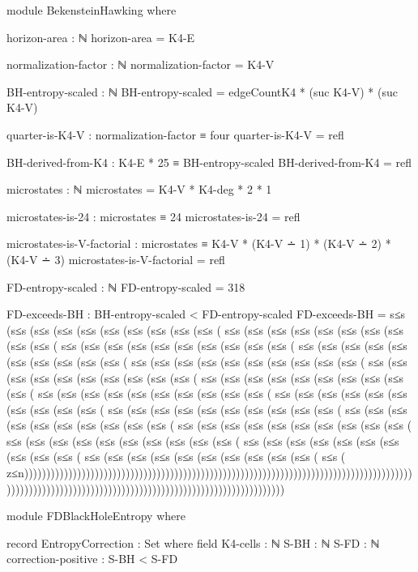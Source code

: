 \documentclass[11pt,a4paper]{book}
\begin{document}
\begin{code}
module BekensteinHawking where

  horizon-area : ℕ
  horizon-area = K4-E

  normalization-factor : ℕ
  normalization-factor = K4-V

  BH-entropy-scaled : ℕ
  BH-entropy-scaled = edgeCountK4 * (suc K4-V) * (suc K4-V)

  quarter-is-K4-V : normalization-factor ≡ four
  quarter-is-K4-V = refl

  BH-derived-from-K4 : K4-E * 25 ≡ BH-entropy-scaled
  BH-derived-from-K4 = refl

  microstates : ℕ
  microstates = K4-V * K4-deg * 2 * 1

  microstates-is-24 : microstates ≡ 24
  microstates-is-24 = refl

  microstates-is-V-factorial : microstates ≡ K4-V * (K4-V ∸ 1) * (K4-V ∸ 2) * (K4-V ∸ 3)
  microstates-is-V-factorial = refl

  FD-entropy-scaled : ℕ
  FD-entropy-scaled = 318

  FD-exceeds-BH : BH-entropy-scaled < FD-entropy-scaled
  FD-exceeds-BH = s≤s (s≤s (s≤s (s≤s (s≤s (s≤s (s≤s (s≤s (s≤s (s≤s (
                  s≤s (s≤s (s≤s (s≤s (s≤s (s≤s (s≤s (s≤s (s≤s (s≤s (
                  s≤s (s≤s (s≤s (s≤s (s≤s (s≤s (s≤s (s≤s (s≤s (s≤s (
                  s≤s (s≤s (s≤s (s≤s (s≤s (s≤s (s≤s (s≤s (s≤s (s≤s (
                  s≤s (s≤s (s≤s (s≤s (s≤s (s≤s (s≤s (s≤s (s≤s (s≤s (
                  s≤s (s≤s (s≤s (s≤s (s≤s (s≤s (s≤s (s≤s (s≤s (s≤s (
                  s≤s (s≤s (s≤s (s≤s (s≤s (s≤s (s≤s (s≤s (s≤s (s≤s (
                  s≤s (s≤s (s≤s (s≤s (s≤s (s≤s (s≤s (s≤s (s≤s (s≤s (
                  s≤s (s≤s (s≤s (s≤s (s≤s (s≤s (s≤s (s≤s (s≤s (s≤s (
                  s≤s (s≤s (s≤s (s≤s (s≤s (s≤s (s≤s (s≤s (s≤s (s≤s (
                  s≤s (s≤s (s≤s (s≤s (s≤s (s≤s (s≤s (s≤s (s≤s (s≤s (
                  s≤s (s≤s (s≤s (s≤s (s≤s (s≤s (s≤s (s≤s (s≤s (s≤s (
                  s≤s (s≤s (s≤s (s≤s (s≤s (s≤s (s≤s (s≤s (s≤s (s≤s (
                  s≤s (s≤s (s≤s (s≤s (s≤s (s≤s (s≤s (s≤s (s≤s (s≤s (
                  s≤s (s≤s (s≤s (s≤s (s≤s (s≤s (s≤s (s≤s (s≤s (s≤s (
                  s≤s (
                  z≤n)))))))))))))))))))))))))))))))))))))))))))))))))))))))))))))))))))))))))))))))))))))))))))))))))))))))))))))))))))))))))))))))))))))))))))))))))))))))

module FDBlackHoleEntropy where

  record EntropyCorrection : Set where
    field
      K4-cells : ℕ
      S-BH : ℕ
      S-FD : ℕ
      correction-positive : S-BH < S-FD
      

\end{code}
\end{document}
